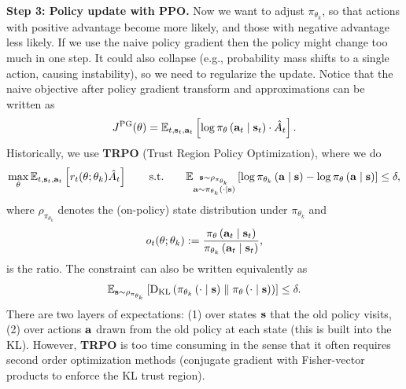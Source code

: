 \documentclass[11pt]{article}  %
\begin{document}
\textbf{Step 3: Policy update with PPO.} Now we want to adjust $\pi_{\theta_k}$, so that actions with positive advantage become more likely, and those with negative advantage less likely.
If we use the naive policy gradient then the policy might change too much in one step.
It could also collapse (e.g., probability mass shifts to a single action, causing instability), so we need to regularize the update.
Notice that the naive objective after policy gradient transform and approximations can be written as 
\begin{align*}
  J^{\text{PG}}(\theta) = \mathbb{E}_{t, \mathbf{s}_t, \mathbf{a}_t}\left[\log \pi_{\theta}\left( \mathbf{a}_t \mid \mathbf{s}_t \right)\cdot \hat{A}_t\right].
\end{align*}
Historically, we use \textbf{TRPO} (Trust Region Policy Optimization), where we do 
\begin{align*}
  \max_{\theta} \mathbb{E}_{t, \mathbf{s}_t, \mathbf{a}_t}\left[r_t(\theta; 
  \theta_k) \hat{A}_t\right] \qquad \text{s.t.} \qquad \mathbb{E}_{\substack{\mathbf{s} \sim \rho_{\pi_{\theta_{k}}} \\ \mathbf{a} \sim \pi_{\theta_{k}}\left( \cdot \mid \mathbf{s} \right)}}\left[\log\pi_{\theta_k}\left( \mathbf{a} \mid \mathbf{s} \right) - \log\pi_{\theta}\left( \mathbf{a} \mid \mathbf{s} \right)\right] \leq \delta,
\end{align*}
where $\rho_{\pi_{\theta_{k}}}$ denotes the (on-policy) state distribution under $\pi_{\theta_{k}}$ and 
\begin{align*}
  o_t(\theta; \theta_k) := \frac{\pi_{\theta}\left( \mathbf{a}_t \mid \mathbf{s}_t \right)}{\pi_{\theta_{k}}\left( \mathbf{a}_t \mid \mathbf{s}_t \right)},
\end{align*}
is the ratio.
The constraint can also be written equivalently as 
\begin{align*}
  \mathbb{E}_{\mathbf{s} \sim \rho_{\pi_{\theta_k}} }\left[{\rm D}_{\text{KL}}\left( \pi_{\theta_{k}}\left( \cdot \mid \mathbf{s} \right) \parallel \pi_{\theta}\left( \cdot \mid \mathbf{s} \right) \right)\right] \leq \delta.
\end{align*}
There are two layers of expectations: (1) over states $\mathbf{s}$ that the old policy visits, (2) over actions $\mathbf{a}$ drawn from the old policy at each state (this is built into the KL).
However, \textbf{TRPO} is too time consuming in the sense that it often requires second order optimization methods (conjugate gradient with Fisher-vector products to enforce the KL trust region).
\end{document}
